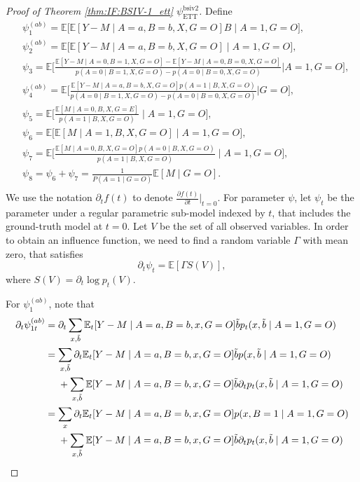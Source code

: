 \documentclass[10pt]{article}
\newcommand{\E}{\mathbb{E}}
\begin{document}
\begin{proof}[Proof of Theorem \ref{thm:IF:BSIV-1_ett} $\psi_{\text{ETT}}^{\text{bsiv2}}$]
	
Define
\begin{align*}
    &\psi_1^{(ab)}=\mathbb{E}\big[\mathbb{E}[Y-M\mid A=a,B=b,X,G=O]B\mid A=1,G=O\big],\\
    &\psi_2^{(ab)}=\mathbb{E}\big[\mathbb{E}[Y-M\mid A=a,B=b,X,G=O]\mid A=1,G=O\big],\\
    &\psi_3=\mathbb{E}\bigg[\frac{\mathbb{E}[Y-M\mid A=0,B=1,X,G=O]-\mathbb{E}[Y-M\mid A=0,B=0,X,G=O]}{p(A=0\mid B=1,X,G=O)-p(A=0\mid B=0,X,G=O)}\bigg|A=1,G=O\bigg],\\
    &\psi_4^{(ab)}=\mathbb{E}\bigg[\frac{\mathbb{E}[Y-M\mid A=a,B=b,X,G=O]p(A=1\mid B,X,G=O)}{p(A=0\mid B=1,X,G=O)-p(A=0\mid B=0,X,G=O)}\bigg|G=O\bigg],\\
    &\psi_5=\mathbb{E}\bigg[\frac{\mathbb{E}[M\mid A=0,B,X,G=E]}{p(A=1\mid B,X,G=O)}\mid A=1,G=O\bigg],\\
    &\psi_6=\mathbb{E}\big[\mathbb{E}[M\mid A=1,B,X,G=O]\mid A=1,G=O\big],\\
    &\psi_7=\mathbb{E}\bigg[\frac{\mathbb{E}[M\mid A=0,B,X,G=O]p(A=0\mid B,X,G=O)}{p(A=1\mid B,X,G=O)}\mid A=1,G=O\bigg],\\
    &\psi_8=\psi_6+\psi_7=\frac{1}{P(A=1\mid G=O)}\mathbb{E}[M\mid G=O].\\
\end{align*}
We use the notation $\partial_tf(t)$ to denote $\frac{\partial f(t)}{\partial t}\big|_{t=0}$.
For parameter $\psi$, let $\psi_t$ be the parameter under a regular parametric sub-model indexed by $t$, that includes the ground-truth model at $t=0$.
Let $V$ be the set of all observed variables.
In order to obtain an influence function, we need to find a random variable $\Gamma$ with mean zero, that satisfies
\[
\partial_t\psi_t=\E[\Gamma S(V)],
\]
where $S(V)=\partial_t\log p_t(V)$.	

For $\psi_1^{(ab)}$, note that
\begin{align*}
    \partial_t\psi_{1t}^{(ab)}&=\partial_t\sum_{x,\Tilde{b}}\mathbb{E}_t[Y-M\mid A=a,B=b,x,G=O]\Tilde{b}p_t(x,\Tilde{b}\mid A=1, G=O)\\
    &=\sum_{x,\Tilde{b}}\partial_t\mathbb{E}_t[Y-M\mid A=a,B=b,x,G=O]\Tilde{b}p(x,\Tilde{b}\mid A=1, G=O)\\
    &\ \ \ \ + \sum_{x,\Tilde{b}}\mathbb{E}[Y-M\mid A=a,B=b,x,G=O]\Tilde{b}\partial_tp_t(x,\Tilde{b}\mid A=1, G=O)\\
    &=\sum_{x}\partial_t\mathbb{E}_t[Y-M\mid A=a,B=b,x,G=O]p(x,B=1\mid A=1, G=O)\\
    &\ \ \ \ + \sum_{x,\Tilde{b}}\mathbb{E}[Y-M\mid A=a,B=b,x,G=O]\Tilde{b}\partial_tp_t(x,\Tilde{b}\mid A=1, G=O)\\
\end{align*}


\end{proof}
\end{document}
